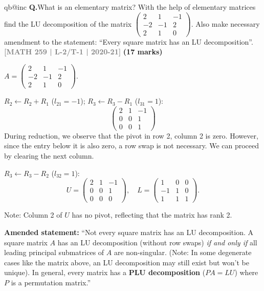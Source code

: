 \documentclass[12pt,a3paper]{article}
\makeatletter
\newcommand{\yr}[1]{\hfill\textcolor{gray}{\small\textbf{[#1]}}}
\newcommand{\mk}[1]{\textcolor{orange!70!black}{\small\textbf{(#1 marks)}}}
\newcounter{qnum}
\newcommand{\Q}[1]{%
  \csname qb@inc\endcsname
  \needspace{4\baselineskip}
  \refstepcounter{qnum}
  \vspace{6pt}
  \noindent\textbf{Q\theqnum.}\enspace #1\par
}
\makeatother
\begin{document}
\Q{What is an elementary matrix? With the help of elementary matrices find the LU decomposition of the matrix $\begin{pmatrix} 2 & 1 & -1 \\ -2 & -1 & 2 \\ 2 & 1 & 0 \end{pmatrix}$. Also make necessary amendment to the statement: ``Every square matrix has an LU decomposition''.
\yr{MATH 259 | L-2/T-1 | 2020-21} \mk{17}}

\begin{tcolorbox}[enhanced,breakable,
  colback=cB!4,colframe=cB,boxrule=0.8pt,arc=5pt,
  title={\textbf{Answer --- LU Decomposition; Amendment to LU Existence Statement}},
  fonttitle=\bfseries\color{white},colbacktitle=cB]

$A=\begin{pmatrix}2&1&-1\\-2&-1&2\\2&1&0\end{pmatrix}$.

$R_2\leftarrow R_2+R_1$ ($l_{21}=-1$); $R_3\leftarrow R_3-R_1$ ($l_{31}=1$):
\[
\begin{pmatrix}2&1&-1\\0&0&1\\0&0&1\end{pmatrix}
\]
During reduction, we observe that the pivot in row 2, column 2 is zero. However, since the entry below it is also zero, a row swap is not necessary. We can proceed by clearing the next column.

$R_3\leftarrow R_3-R_2$ ($l_{32}=1$):
\[
U=\begin{pmatrix}2&1&-1\\0&0&1\\0&0&0\end{pmatrix},\quad
L=\begin{pmatrix}1&0&0\\-1&1&0\\1&1&1\end{pmatrix}.
\]

Note: Column 2 of $U$ has no pivot, reflecting that the matrix has rank 2.

\medskip
\textbf{Amended statement:} ``Not every square matrix has an LU decomposition. A square matrix $A$ has an LU decomposition (without row swaps) \emph{if and only if} all leading principal submatrices of $A$ are non-singular. (Note: In some degenerate cases like the matrix above, an LU decomposition may still exist but won't be unique). In general, every matrix has a \textbf{PLU decomposition} ($PA=LU$) where $P$ is a permutation matrix.''

\end{tcolorbox}
\end{document}
